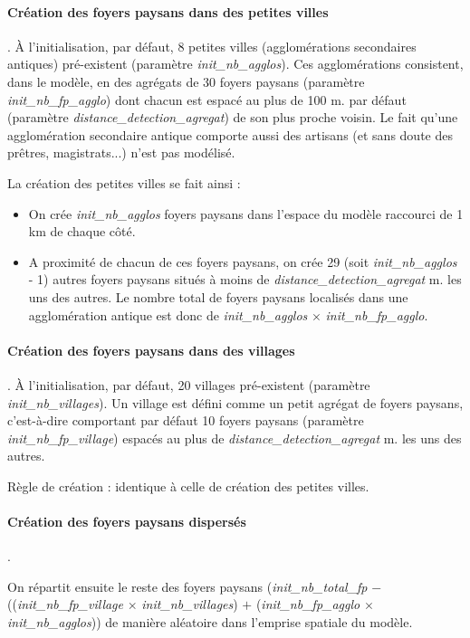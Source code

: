 \documentclass[a4paper,11pt]{article}
\begin{document}
\begin{sloppypar}
\paragraph{Création des foyers paysans dans des petites villes}. À l'initialisation, par défaut, 8 petites villes (agglomérations secondaires antiques) pré-existent (paramètre \textit{init\_nb\_agglos}). Ces agglomérations consistent, dans le modèle, en des agrégats de 30 foyers paysans (paramètre \textit{init\_nb\_fp\_agglo}) dont chacun est espacé au plus de 100 m. par défaut (paramètre \textit{distance\_detection\_agregat}) de son plus proche voisin. Le fait qu'une agglomération secondaire antique comporte aussi des artisans (et sans doute des prêtres, magistrats...) n'est pas modélisé.
\end{sloppypar}

La création des petites villes se fait ainsi :
\begin{sloppypar}
\begin{itemize}
  \item On crée \textit{init\_nb\_agglos} foyers paysans dans l'espace du modèle raccourci de 1 km de chaque côté.
  \item A proximité de chacun de ces foyers paysans, on crée 29 (soit \textit{init\_nb\_agglos} - 1) autres foyers paysans situés à moins de \textit{distance\_detection\_agregat} m. les uns des autres. Le nombre total de foyers paysans localisés dans une agglomération antique est donc de \textit{init\_nb\_agglos} $\times$ \textit{init\_nb\_fp\_agglo}.
\end{itemize}
\end{sloppypar}

\paragraph{Création des foyers paysans dans des villages}. À l'initialisation, par défaut, 20 villages pré-existent (paramètre \textit{init\_nb\_villages}). Un village est défini comme un petit agrégat de foyers paysans, c'est-à-dire comportant par défaut 10 foyers paysans (paramètre \textit{init\_nb\_fp\_village}) espacés au plus de \textit{distance\_detection\_agregat} m. les uns des autres.

Règle de création : identique à celle de création des petites villes.

\paragraph{Création des foyers paysans dispersés}.
\begin{sloppypar}
On répartit ensuite le reste des foyers paysans (\textit{init\_nb\_total\_fp} $-$ ((\textit{init\_nb\_fp\_village} $\times$ \textit{init\_nb\_villages}) $+$ (\textit{init\_nb\_fp\_agglo} $\times$ \textit{init\_nb\_agglos})) de manière aléatoire dans l'emprise spatiale du modèle.
\end{sloppypar}
\end{document}
